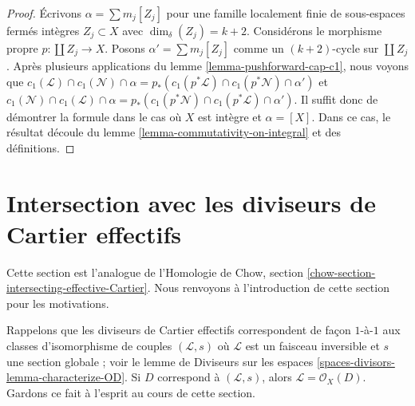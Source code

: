\begin{proof}
Écrivons $\alpha = \sum m_j[Z_j]$ pour une famille localement finie de
sous-espaces fermés intègres $Z_j \subset X$ avec $\dim_\delta(Z_j) = k + 2$.
Considérons le morphisme propre $p : \coprod Z_j \to X$. Posons
$\alpha' = \sum m_j[Z_j]$ comme un $(k + 2)$-cycle sur $\coprod Z_j$. Après
plusieurs applications du lemme \ref{lemma-pushforward-cap-c1}, nous voyons que
$c_1(\mathcal{L}) \cap c_1(\mathcal{N}) \cap \alpha = p_*(c_1(p^*\mathcal{L})
\cap c_1(p^*\mathcal{N}) \cap \alpha')$ et $c_1(\mathcal{N}) \cap
c_1(\mathcal{L}) \cap \alpha = p_*(c_1(p^*\mathcal{N}) \cap
c_1(p^*\mathcal{L}) \cap \alpha')$. Il suffit donc de démontrer la formule dans
le cas où $X$ est intègre et $\alpha = [X]$. Dans ce cas, le résultat
découle du lemme \ref{lemma-commutativity-on-integral} et des définitions.
\end{proof}

















\section{Intersection avec les diviseurs de Cartier effectifs}
\label{section-intersecting-effective-Cartier}

\noindent
Cette section est l'analogue de l'Homologie de Chow, section
\ref{chow-section-intersecting-effective-Cartier}. Nous renvoyons à
l'introduction de cette section pour les motivations.

\medskip\noindent
Rappelons que les diviseurs de Cartier effectifs correspondent de façon $1$-à-$1$ aux
classes d'isomorphisme de couples $(\mathcal{L}, s)$ où $\mathcal{L}$ est un
faisceau inversible et $s$ une section globale ; voir le lemme de Diviseurs sur les
espaces \ref{spaces-divisors-lemma-characterize-OD}. Si $D$ correspond
à $(\mathcal{L}, s)$, alors $\mathcal{L} = \mathcal{O}_X(D)$. Gardons
ce fait à l'esprit au cours de cette section.

